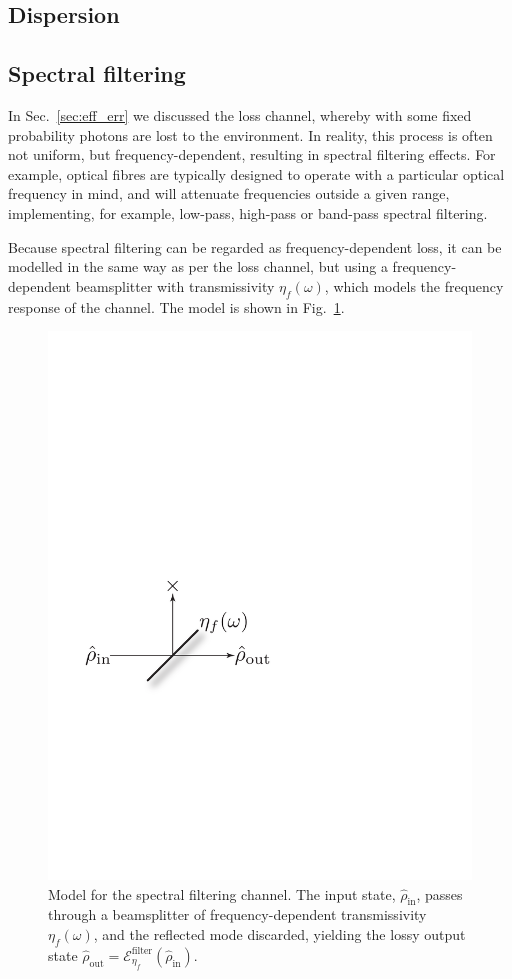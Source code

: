 \documentclass[aps, rmp, twocolumn, amsmath, amssymb, nofootinbib, superscriptaddress, longbibliography, floatfix, table-of-contents, eqsecnum]{revtex4-1}
\newcommand{\comment}[1]{{\color{blue}{\textbf{#1}}}}
\begin{document}
%
%

\subsection{Dispersion} \label{sec:dispersion}

\comment{To do!}

%
%

\subsection{Spectral filtering} \label{sec:spectral_filt} 

In Sec.~\ref{sec:eff_err} we discussed the loss channel, whereby with some fixed probability photons are lost to the environment. In reality, this process is often not uniform, but frequency-dependent, resulting in spectral filtering effects. For example, optical fibres are typically designed to operate with a particular optical frequency in mind, and will attenuate frequencies outside a given range, implementing, for example, low-pass, high-pass or band-pass spectral filtering.

Because spectral filtering can be regarded as frequency-dependent loss, it can be modelled in the same way as per the loss channel, but using a frequency-dependent beamsplitter with transmissivity $\eta_f(\omega)$, which models the frequency response of the channel. The model is shown in Fig.~\ref{fig:spectral_filter_model}.

\begin{figure}[!htb]
	\includegraphics[width=0.5\columnwidth]{spectral_filter_model}
	\caption{Model for the spectral filtering channel. The input state, $\hat\rho_\text{in}$, passes through a beamsplitter of frequency-dependent transmissivity $\eta_f(\omega)$, and the reflected mode discarded, yielding the lossy output state \mbox{$\hat\rho_\text{out} = \mathcal{E}^\text{filter}_{\eta_f}(\hat\rho_\text{in})$}.} \label{fig:spectral_filter_model} 
\end{figure}
\end{document}
